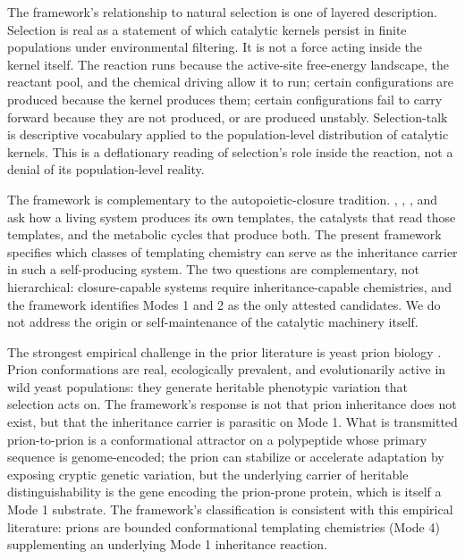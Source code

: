 \documentclass[aps,prx,reprint,amsmath,amssymb,floatfix,superscriptaddress,nofootinbib]{revtex4-2}
\theoremstyle{plain-thm}
\theoremstyle{definition-thm}
\begin{document}
The framework's relationship to natural selection is one of layered description. Selection is real as a statement of which catalytic kernels persist in finite populations under environmental filtering. It is not a force acting inside the kernel itself. The reaction runs because the active-site free-energy landscape, the reactant pool, and the chemical driving allow it to run; certain configurations are produced because the kernel produces them; certain configurations fail to carry forward because they are not produced, or are produced unstably. Selection-talk is descriptive vocabulary applied to the population-level distribution of catalytic kernels. This is a deflationary reading of selection's role inside the reaction, not a denial of its population-level reality.

The framework is complementary to the autopoietic-closure tradition. \citet{Rosen1958}, \citet{MaturanaVarela1972}, \citet{Pattee1972}, and \citet{Hofmeyr2017} ask how a living system produces its own templates, the catalysts that read those templates, and the metabolic cycles that produce both. The present framework specifies which classes of templating chemistry can serve as the inheritance carrier in such a self-producing system. The two questions are complementary, not hierarchical: closure-capable systems require inheritance-capable chemistries, and the framework identifies Modes 1 and 2 as the only attested candidates. We do not address the origin or self-maintenance of the catalytic machinery itself.

The strongest empirical challenge in the prior literature is yeast prion biology \citep{HalfmannLindquist2010, Halfmann2012}. Prion conformations are real, ecologically prevalent, and evolutionarily active in wild yeast populations: they generate heritable phenotypic variation that selection acts on. The framework's response is not that prion inheritance does not exist, but that the inheritance carrier is parasitic on Mode 1. What is transmitted prion-to-prion is a conformational attractor on a polypeptide whose primary sequence is genome-encoded; the prion can stabilize or accelerate adaptation by exposing cryptic genetic variation, but the underlying carrier of heritable distinguishability is the gene encoding the prion-prone protein, which is itself a Mode 1 substrate. The framework's classification is consistent with this empirical literature: prions are bounded conformational templating chemistries (Mode 4) supplementing an underlying Mode 1 inheritance reaction.
\end{document}
